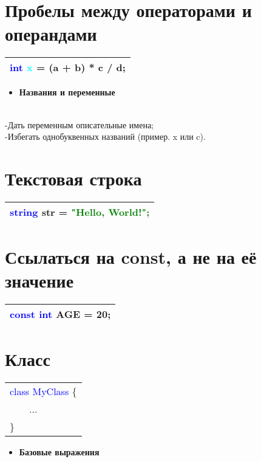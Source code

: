 \documentclass[12pt, letterpaper]{article}
\begin{document}
\section{Пробелы между операторами и операндами}
\begin{flushleft}
\begin{tabular}{ |l| } 
 \hline
\textcolor{blue}{int} \textcolor{cyan}{x }= (a + b) * c / d; \\
 \hline
\end{tabular}
\end{flushleft}
\begin{itemize}
\vspace*{10mm}
\hline
    \item \Large\textbf{Названия и переменные}
\end{itemize}
\\-Дать переменным описательные имена;
\\-Избегать однобуквенных названий (пример. x или c).
\setcounter{section}{0}
\section{Текстовая строка}
\begin{flushleft}
\begin{tabular}{ |l| } 
 \hline
\textcolor{blue}{string} str = \textcolor{green}{"Hello, World!";} \\
\hline
\end{tabular}
\end{flushleft}
\section{Ссылаться на const, а не на её значение}
\begin{flushleft}
\begin{tabular}{ |l| } 
\hline
    \textcolor{blue}{const int} AGE = 20;\\
\hline
\end{tabular}
\end{flushleft}
\section{Класс}

\begin{flushleft}
\begin{tabular}{ |l| } 
\hline
\textcolor{blue}{class MyClass }\{\\
\ \ \ \   ...\\
\}\\
\hline
\end{tabular}
\end{flushleft}
    \begin{itemize}
\vspace*{10mm}
\hline
    \item \Large\textbf{Базовые выражения}
\end{itemize}
\setcounter{section}{0}
\end{document}
